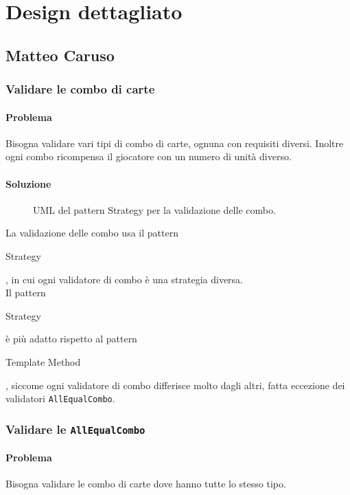 \documentclass[a4paper,12pt]{report}
\begin{document}
\section{Design dettagliato}
\subsection{Matteo Caruso}
\subsubsection{Validare le combo di carte}
\paragraph{Problema}
Bisogna validare vari tipi di combo di carte, ognuna con requisiti diversi. Inoltre ogni combo ricompensa il giocatore con un numero di unità diverso.
\paragraph{Soluzione}
\begin{figure}[H]
	\centering
	
	\caption{UML del pattern Strategy per la validazione delle combo.}
\end{figure}
La validazione delle combo usa il pattern \begin{itshape}Strategy\end{itshape}, in cui ogni validatore di combo è una strategia diversa.
\\
Il pattern \begin{itshape}Strategy\end{itshape} è più adatto rispetto al pattern \begin{itshape}Template Method\end{itshape}, siccome ogni validatore di combo differisce molto dagli altri, fatta eccezione dei validatori \texttt{AllEqualCombo}.

\subsubsection{Validare le \texttt{AllEqualCombo}}
\paragraph{Problema}
Bisogna validare le combo di carte dove hanno tutte lo stesso tipo.
\end{document}
